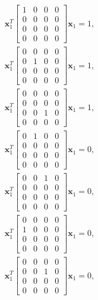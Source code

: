 \documentclass{article}
\begin{document}
\begin{align}
    \mathbf{x}_1^T  \begin{bmatrix} 1 & 0 & 0 & 0 \\ 0 & 0 & 0 & 0 \\ 0 & 0 & 0 & 0 \\ 0 & 0 & 0 & 0 \end{bmatrix} \mathbf{x}_1 = 1,\\
    \mathbf{x}_1^T  \begin{bmatrix} 0 & 0 & 0 & 0 \\ 0 & 1 & 0 & 0 \\ 0 & 0 & 0 & 0 \\ 0 & 0 & 0 & 0 \end{bmatrix} \mathbf{x}_1 = 1,\\
    \mathbf{x}_1^T  \begin{bmatrix} 0 & 0 & 0 & 0 \\ 0 & 0 & 0 & 0 \\ 0 & 0 & 1 & 0 \\ 0 & 0 & 0 & 0 \end{bmatrix} \mathbf{x}_1 = 1,\\
    \mathbf{x}_1^T  \begin{bmatrix} 0 & 1 & 0 & 0 \\ 0 & 0 & 0 & 0 \\ 0 & 0 & 0 & 0 \\ 0 & 0 & 0 & 0 \end{bmatrix} \mathbf{x}_1 = 0,\\
    \mathbf{x}_1^T  \begin{bmatrix} 0 & 0 & 1 & 0 \\ 0 & 0 & 0 & 0 \\ 0 & 0 & 0 & 0 \\ 0 & 0 & 0 & 0 \end{bmatrix} \mathbf{x}_1 = 0,\\
    \mathbf{x}_1^T  \begin{bmatrix} 0 & 0 & 0 & 0 \\ 1 & 0 & 0 & 0 \\ 0 & 0 & 0 & 0 \\ 0 & 0 & 0 & 0 \end{bmatrix} \mathbf{x}_1 = 0,\\
    \mathbf{x}_1^T  \begin{bmatrix} 0 & 0 & 0 & 0 \\ 0 & 0 & 1 & 0 \\ 0 & 0 & 0 & 0 \\ 0 & 0 & 0 & 0 \end{bmatrix} \mathbf{x}_1 = 0,\\

\end{align}
\end{document}
